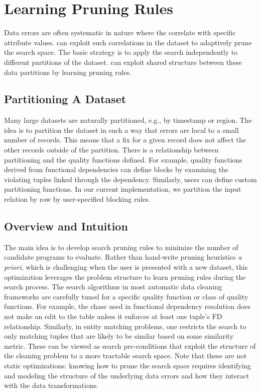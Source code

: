 \section{Learning Pruning Rules}\label{s:pruning}
Data errors are often systematic in nature where the correlate with specific attribute values.
\sys can exploit such correlations in the dataset to adaptively prune the search space.
The basic strategy is to apply the search independently to different partitions of the dataset.
\sys can exploit shared structure between these data partitions by learning pruning rules.

\subsection{Partitioning A Dataset}
Many large datasets are naturally partitioned, e.g., by timestamp or region. 
The idea is to partition the dataset in such a way that errors are local to a small number of records.
This means that a fix for a given record does not affect the other records outside of the partition.
There is a relationship between partitioning and the quality functions defined.
For example, quality functions derived from functional dependencies can define blocks by examining the violating tuples linked through the dependency.  Similarly, users can define custom partitioning functions.  In our current implementation, we partition the input relation by row by user-specified blocking rules.

\subsection{Overview and Intuition}\label{s:dynlearn}
The main idea is to develop search pruning rules to minimize the number of candidate programs to evaluate.  Rather than hand-write pruning heuristics {\it a priori}, which is challenging when the user is presented with a new dataset, this optimization leverages the problem structure to learn pruning rules during the search process.
The search algorithms in  most automatic data cleaning frameworks are carefully tuned for a specific quality function or class of quality functions. For example, the chase used in functional dependency resolution does not make an edit to the table unless it enforces at least one tuple's FD relationship.    Similarly, in entity matching problems, one restricts the search to only matching tuples that are likely to be similar based on some similarity metric.
These can be viewed as search pre-conditions that exploit the structure of the cleaning problem to a more tractable search space.
Note that these are not static optimizations: knowing how to prune the search space requires identifying and modeling the structure of the underlying data errors and how they interact with the data transformations.


